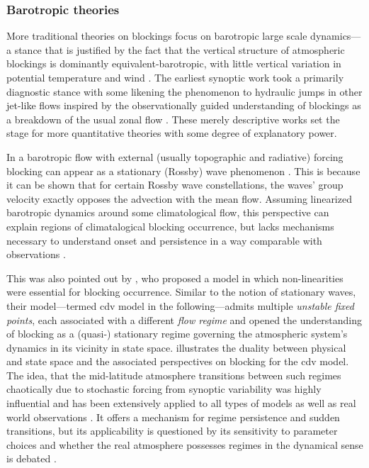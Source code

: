 \subsubsection{Barotropic theories} \label{sec:intro_block_barotropic}
More traditional theories on blockings focus on barotropic large scale
dynamics---a stance that is justified by the fact that the vertical structure
of atmospheric blockings is dominantly equivalent-barotropic, with little
vertical variation in potential temperature and wind
\parencite{nabizadeh3DStructureNorthern2021}. The earliest synoptic work took a
primarily diagnostic stance with some likening the phenomenon
to hydraulic jumps in other jet-like flows
\parencite{rexBlockingActionMiddle1950} inspired by the observationally guided
understanding of blockings as a breakdown of the usual zonal flow
\parencite{berggrenAerologicalStudyZonal1949}. These merely descriptive works
set the stage for more quantitative theories with some degree of
explanatory power.

In a barotropic flow with external (usually topographic and radiative) forcing
blocking can appear as a stationary (Rossby) wave phenomenon
\parencite{rossbyRelationVariationsIntensity1939}. This is because it can be
shown that for certain Rossby wave constellations, the waves' group velocity
exactly opposes the advection with the mean flow. Assuming linearized
barotropic dynamics around some climatological flow, this perspective can
explain regions of climatalogical blocking occurrence, but lacks mechanisms
necessary to understand onset and persistence in a way comparable with
observations \parencite{hoskinsSteadyLinearResponse1981}.

This was also pointed out by \textcite{charneyMultipleFlowEquilibria1979}, who
proposed a model in which non-linearities were essential for blocking
occurrence. Similar to the notion of stationary waves, their
model---termed \gls{cdv} model in the following---admits
multiple \emph{unstable fixed points}, each associated with a different
\emph{flow regime}
and opened the understanding of blocking as a (quasi-) stationary regime
governing the atmospheric system's dynamics in its vicinity in state space.
 illustrates the duality between physical and state
space and the associated perspectives on blocking for the \gls{cdv} model. The
idea, that the mid-latitude atmosphere transitions between such regimes
chaotically due to stochastic forcing from synoptic variability was highly
influential and has been extensively applied to all types of models
\parencite{legrasPersistentAnomaliesBlocking1985,
    zidikheriMultipleEquilibriaAtmospheric2007,
    kondrashovEmpiricalModeReduction2006} as well as real world observations
\parencite{moClusterAnalysisMultiple1988, vautardMultipleWeatherRegimes1990,
    farandaSwitchingZonalBlocked2016}. It offers a mechanism for
regime persistence and sudden transitions, but its applicability is questioned
by its sensitivity to parameter choices
\parencite{crommelinMechanismAtmosphericRegime2004} and whether the real
atmosphere possesses regimes in the dynamical sense is debated
\parencite{stephensonExistenceMultipleClimate2004}.

